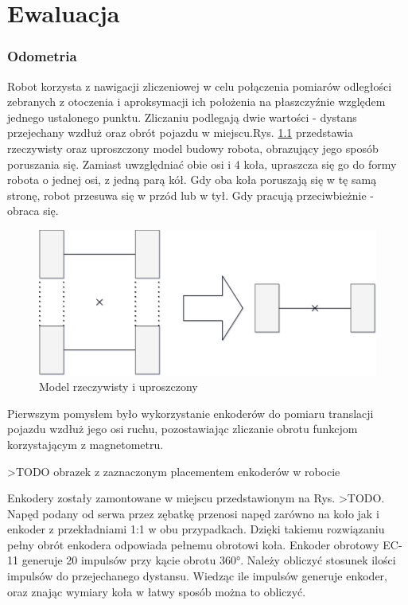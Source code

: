\chapter{Ewaluacja}

\subsection{Odometria}
Robot korzysta z nawigacji zliczeniowej w celu połączenia pomiarów odległości zebranych z otoczenia i aproksymacji ich położenia na płaszczyźnie względem jednego ustalonego punktu. Zliczaniu podlegają dwie wartości - dystans przejechany wzdłuż oraz obrót pojazdu w miejscu.Rys. \ref{fig:odom-axis-simplified} przedstawia rzeczywisty oraz uproszczony model budowy robota, obrazujący jego sposób poruszania się. Zamiast uwzględniać obie osi i 4 koła, upraszcza się go do formy robota o jednej osi, z jedną parą kół. Gdy oba koła poruszają się w tę samą stronę, robot przesuwa się w przód lub w tył. Gdy pracują przeciwbieżnie - obraca się.

\begin{figure}[ht]
	\centering
		\includegraphics[width=0.8\linewidth]{rys/robot-odometry-simplified.pdf}
	\caption{Model rzeczywisty i uproszczony}
	\label{fig:odom-axis-simplified}
\end{figure}


Pierwszym pomysłem było wykorzystanie enkoderów do pomiaru translacji pojazdu wzdłuż jego osi ruchu, pozostawiając zliczanie obrotu funkcjom korzystającym z magnetometru.

>TODO obrazek z zaznaczonym placementem enkoderów w robocie

Enkodery zostały zamontowane w miejscu przedstawionym na Rys. >TODO. Napęd podany od serwa przez zębatkę przenosi napęd zarówno na koło jak i enkoder z przekładniami 1:1 w obu przypadkach. Dzięki takiemu rozwiązaniu pełny obrót enkodera odpowiada pełnemu obrotowi koła. Enkoder obrotowy EC-11 generuje 20 impulsów przy kącie obrotu 360°. Należy obliczyć stosunek ilości impulsów do przejechanego dystansu. Wiedząc ile impulsów generuje enkoder, oraz znając wymiary koła w łatwy sposób można to obliczyć.

